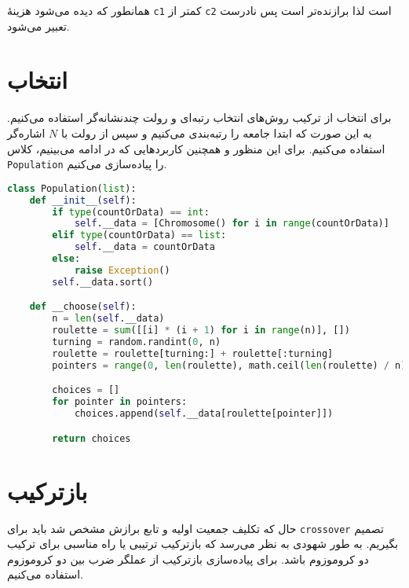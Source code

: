 \documentclass[a4paper, 12pt]{article}
\theoremstyle{definition}
\begin{document}
همانطور که دیده می‌شود هزینهٔ
\texttt{c1}
کمتر از
\texttt{c2}
است لذا برازنده‌تر است پس
نادرست تعبیر می‌شود.

\section{انتخاب}
برای انتخاب از ترکیب روش‌های انتخاب رتبه‌ای و رولت چندنشانه‌گر استفاده می‌کنیم. به این صورت که ابتدا جامعه را رتبه‌بندی می‌کنیم و سپس از رولت با
$N$
اشاره‌گر استفاده می‌کنیم. برای این منظور و همچنین کاربردهایی که در ادامه می‌بینیم، کلاس
\texttt{Population}
را پیاده‌سازی می‌کنیم.

\LTR
\begin{lstlisting}[language=Python]
class Population(list):
    def __init__(self):
        if type(countOrData) == int:
            self.__data = [Chromosome() for i in range(countOrData)]
        elif type(countOrData) == list:
            self.__data = countOrData
        else:
            raise Exception()
        self.__data.sort()

    def __choose(self):
        n = len(self.__data)
        roulette = sum([[i] * (i + 1) for i in range(n)], [])
        turning = random.randint(0, n)
        roulette = roulette[turning:] + roulette[:turning]
        pointers = range(0, len(roulette), math.ceil(len(roulette) / n))

        choices = []
        for pointer in pointers:
            choices.append(self.__data[roulette[pointer]])

        return choices
\end{lstlisting}
\RTL


\section{بازترکیب}
حال که تکلیف جمعیت اولیه و تابع برازش مشخص شد باید برای
\texttt{crossover}
تصمیم بگیریم. به طور شهودی به نظر می‌رسد که بازترکیب ترتیبی یا
راه مناسبی برای ترکیب دو کروموزوم باشد. برای پیاده‌سازی بازترکیب از عملگر ضرب بین دو کروموزوم استفاده می‌کنیم.
\end{document}
